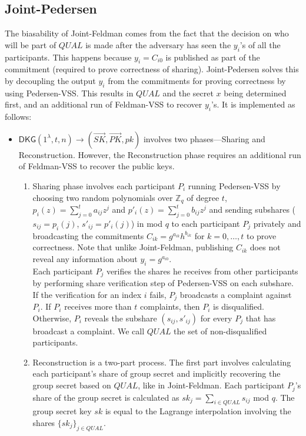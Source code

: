 \documentclass[letterpaper,twocolumn,10pt]{article}
\theoremstyle{definition}
\theoremstyle{remark}
\begin{document}
\subsection{Joint-Pedersen}
\label{appendix:jointPedersen}
The biasability of Joint-Feldman comes from the fact that the decision on who will be part of $QUAL$ is made after the adversary has seen the $y_i$'s of all the participants. This happens because $y_i = C_{i0}$ is published as part of the commitment (required to prove correctness of sharing). Joint-Pedersen solves this by decoupling the output $y_i$ from the commitments for proving correctness by using Pedersen-VSS. This results in $QUAL$ and the secret $x$ being determined first, and an additional run of Feldman-VSS to recover $y_i$'s. It is implemented as follows:
\begin{itemize}
    \item $\mathsf{DKG}(1^{\lambda}, t, n) \rightarrow (\vec{SK}, \vec{PK}, pk)$ involves two phases---Sharing and Reconstruction. However, the Reconstruction phase requires an additional run of Feldman-VSS to recover the public keys. 
    \begin{enumerate}
    \item Sharing phase involves each participant $P_i$ running Pedersen-VSS by choosing two random polynomials over $\mathbb{Z}_q$ of degree $t$, $p_i(z) = \sum_{j = 0}^{t} a_{ij} z^j$ and $p'_i(z) = \sum_{j = 0}^{t} b_{ij} z^j$ and sending subshares ($s_{ij} = p_i(j)$, $s'_{ij} = p'_i(j)$) in mod $q$ to each participant $P_j$ privately and broadcasting the commitments $C_{ik} = g^{a_{ik}} h^{b_{ik}}$ for $k = 0, \ldots, t$ to prove correctness. Note that unlike Joint-Feldman, publishing $C_{ik}$ does not reveal any information about $y_i = g^{a_{i0}}$.\\
    Each participant $P_j$ verifies the shares he receives from other participants by performing share verification step of Pedersen-VSS on each subshare. If the verification for an index $i$ fails, $P_j$ broadcasts a complaint against $P_i$.
    If $P_i$ receives more than $t$ complaints, then $P_i$ is disqualified. Otherwise, $P_i$ reveals the subshare $(s_{ij}, s'_{ij})$ for every $P_j$ that has broadcast a complaint. We call $QUAL$ the set of non-disqualified participants.
    
    \item Reconstruction is a two-part process. The first part involves calculating each participant's share of group secret and implicitly recovering the group secret based on $QUAL$, like in Joint-Feldman. Each participant $P_j$'s share of the group secret is calculated as $sk_j = \sum_{i \in QUAL} s_{ij}$ mod $q$. The group secret key $sk$ is equal to the Lagrange interpolation involving the shares $\{sk_j\}_{j \in QUAL}$. 
    

\end{enumerate}
\end{itemize}
\end{document}
